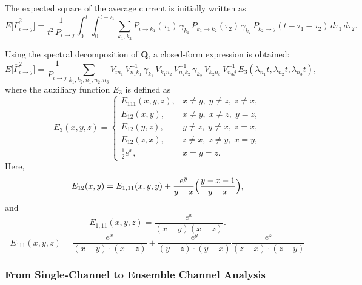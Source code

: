 \documentclass[9pt]{elife}
\begin{document}
	The expected square of the average current is initially written as
	\begin{equation}
		E\bigl[\overline{\Gamma}_{i\rightarrow j}^2\bigr] = \frac{1}{t^2\,P_{i\rightarrow j}} \int_0^t\int_0^{t-\tau_1} \sum_{k_1,k_2} P_{i\rightarrow k_1}(\tau_1)\,\gamma_{k_1}\,P_{k_1\rightarrow k_2}(\tau_2)\,\gamma_{k_2}\,P_{k_2\rightarrow j}(t-\tau_1-\tau_2)\,d\tau_1\,d\tau_2.
		\label{eq:expected_square_integral_short}
	\end{equation}
	
	Using the spectral decomposition of \(\mathbf{Q}\), a closed-form expression is obtained:
	\begin{equation}
		E\bigl[\overline{\Gamma}_{i\rightarrow j}^2\bigr] = \frac{1}{P_{i\rightarrow j}} \sum_{k_1,k_2,n_1,n_2,n_3} V_{i n_1}\,V^{-1}_{n_1 k_1}\,\gamma_{k_1}\,V_{k_1 n_2}\,V^{-1}_{n_2 k_2}\,\gamma_{k_2}\,V_{k_2 n_3}\,V^{-1}_{n_3 j}\,E_3(\lambda_{n_1}t,\lambda_{n_2}t,\lambda_{n_3}t),
		\label{eq:expected_square_closed_short}
	\end{equation}
	where the auxiliary function \(E_3\) is defined as
	\begin{equation}
		E_3(x,y,z)= 
		\begin{cases}
			E_{111}(x,y,z), & x\neq y,\; y\neq z,\; z\neq x,\\[1mm]
			E_{12}(x,y),   & x\neq y,\; x\neq z,\; y=z,\\[1mm]
			E_{12}(y,z),   & y\neq z,\; y\neq x,\; z=x,\\[1mm]
			E_{12}(z,x),   & z\neq x,\; z\neq y,\; x=y,\\[1mm]
			\frac{1}{2}e^x, & x=y=z.
		\end{cases}
		\label{eq:E3_short}
	\end{equation}
	Here,
	\begin{equation}
		E_{12}(x,y)= E_{1,11}(x,y,y) + \frac{e^y}{y-x}\Bigl(\frac{y-x-1}{y-x}\Bigr),
		\label{eq:E12_short}
	\end{equation}
	and
	\begin{equation}
		E_{1,11}(x,y,z)= \frac{e^x}{(x-y)(x-z)}.
		\label{eq:E1_11_short}
	\end{equation}
	\begin{equation}
		E_{111}(x,y,z)= \frac{e^x}{(x-y)\cdot (x-z)} +\frac{e^y}{(y-z)\cdot (y-x)} \frac{e^z}{(z-x)\cdot (z-y)} 
		\label{eq:E111_short}
	\end{equation}
	
	
	\subsubsection{From Single-Channel to Ensemble Channel Analysis}
	
\end{document}
